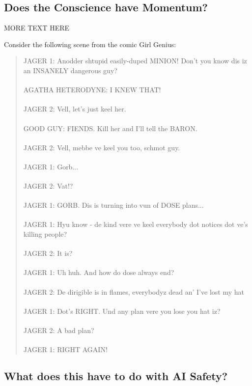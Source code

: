 \documentclass{article}
\begin{document}
\subsection{Does the Conscience have Momentum?}

MORE TEXT HERE

Consider the following scene from the comic Girl Genius\cite{jagers}:

\begin{quote}
  JAGER 1: Anodder shtupid easily-duped MINION! Don't you know dis iz
  an INSANELY dangerous guy?\\
  \\
  AGATHA HETERODYNE: I KNEW THAT!\\
  \\
  JAGER 2: Vell, let's just keel her.\\
  \\
  GOOD GUY: FIENDS. Kill her and I'll tell the BARON.\\
  \\
  JAGER 2: Vell, mebbe ve keel you too, schmot guy.\\
  \\
  JAGER 1: Gorb...\\
  \\
  JAGER 2: Vat!?\\
  \\
  JAGER 1: GORB. Dis is turning into vun of DOSE plans...\\
  \\
  JAGER 1: Hyu know - de kind vere ve keel everybody dot notices dot
  ve's killing people?\\
  \\
  JAGER 2: It is?\\
  \\
  JAGER 1: Uh huh. And how do dose always end?\\
  \\
  JAGER 2: De dirigible is in flames, everybodyz dead an' I've lost my
  hat\\
  \\
  JAGER 1: Dot's RIGHT. Und any plan vere you lose you hat iz?\\
  \\
  JAGER 2: A bad plan?\\
  \\
  JAGER 1: RIGHT AGAIN!\\ 
\end{quote}

\subsection{What does this have to do with AI Safety?}
\end{document}
